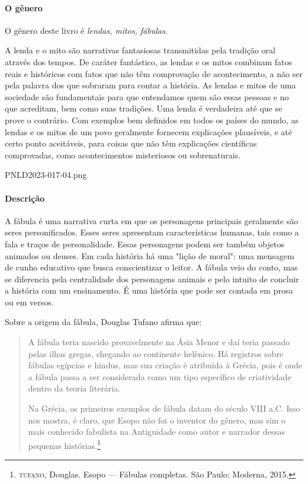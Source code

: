\documentclass[11pt]{extarticle}
\begin{document}
\paragraph{O gênero} O gênero deste livro é \textit{lendas, mitos, fábulas}.

A lenda e o mito são narrativas fantasiosas transmitidas pela tradição oral através dos tempos. De caráter fantástico, as lendas e os mitos combinam fatos reais e históricos com fatos que não têm comprovação de acontecimento, a não ser pela palavra dos que sobraram para contar a história. As lendas e mitos de uma sociedade são fundamentais para que entendamos quem são essas pessoas e no que acreditam, bem como suas tradições. Uma lenda é verdadeira até que se prove o contrário. Com exemplos bem definidos em todos os países do mundo, as lendas e os mitos de um povo geralmente fornecem explicações plausíveis, e até certo ponto aceitáveis, para coisas que não têm explicações científicas comprovadas, como acontecimentos misteriosos ou sobrenaturais.

 {PNLD2023-017-04.png}

\paragraph{Descrição} A fábula é uma narrativa curta em que os personagens principais geralmente são seres personificados. Esses seres apresentam características humanas, tais como a fala e traços de personalidade. Essas personagens podem ser também objetos animados ou deuses. Em cada história há uma "lição de moral": uma mensagem de cunho educativo que busca conscientizar o leitor. A fábula veio do conto, mas se diferencia pela centralidade dos personagens animais e pelo intuito de concluir a história com um ensinamento. É uma história que pode ser contada em prosa ou em versos. 

Sobre a origem da fábula, Douglas Tufano afirma que:

\begin{quote} A fábula teria nascido provavelmente na Ásia Menor e daí teria passado pelas ilhas gregas, chegando ao continente helênico. Há registros sobre fábulas egípcias e hindus, mas sua criação é atribuída à Grécia, pois é onde a fábula passa a ser considerada como um tipo específico de criatividade dentro da teoria literária. 

Na Grécia, os primeiros exemplos de fábula datam do século VIII a.C. Isso nos mostra, é claro, que Esopo não foi o inventor do gênero, mas sim o mais conhecido fabulista na Antiguidade como autor e narrador dessas pequenas histórias.\footnote{\textsc{tufano}, Douglas. Esopo --- Fábulas completas. São Paulo: Moderna, 2015.}
\end{quote}
\end{document}
